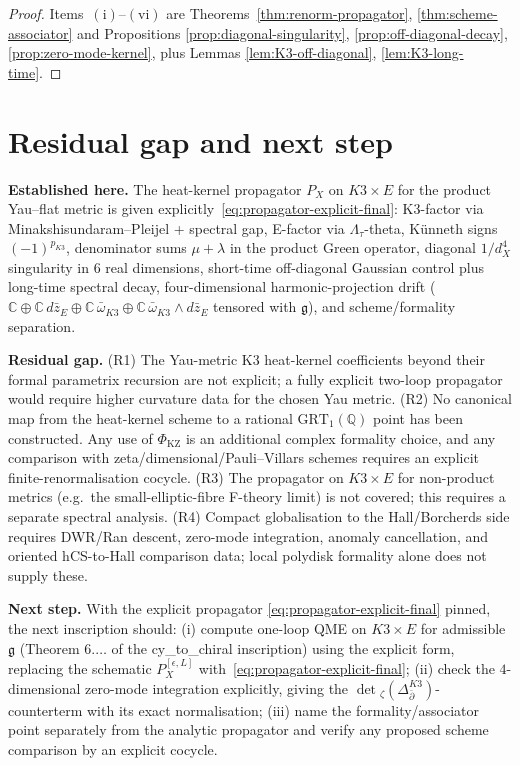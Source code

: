 \documentclass[11pt]{amsart}
\providecommand{\dbar}{\bar\partial}
\providecommand{\C}{\mathbb{C}}
\providecommand{\Q}{\mathbb{Q}}
\providecommand{\frakg}{\mathfrak{g}}
\providecommand{\GRT}{\mathrm{GRT}}
\theoremstyle{definition}
\theoremstyle{remark}
\begin{document}
\begin{proof}
Items~$(\mathrm{i})$--$(\mathrm{vi})$ are
Theorems~\ref{thm:renorm-propagator}, \ref{thm:scheme-associator}
and Propositions \ref{prop:diagonal-singularity},
\ref{prop:off-diagonal-decay}, \ref{prop:zero-mode-kernel}, plus
Lemmas \ref{lem:K3-off-diagonal}, \ref{lem:K3-long-time}.
\end{proof}

\section{Residual gap and next step}
\label{sec:residual}

\textbf{Established here.} The heat-kernel propagator
$P_X$ on $K3 \times E$ for the product Yau--flat metric is given
explicitly~\eqref{eq:propagator-explicit-final}: K3-factor via
Minakshisundaram--Pleijel + spectral gap, E-factor via
$\Lambda_\tau$-theta, K\"unneth signs $(-1)^{p_{K3}}$, denominator
sums $\mu+\lambda$ in the product Green operator, diagonal
$1/d_X^4$ singularity in $6$ real dimensions, short-time
off-diagonal Gaussian control plus long-time spectral decay,
four-dimensional harmonic-projection drift
($\C \oplus \C\,d\bar z_E \oplus \C\,\bar\omega_{K3}
\oplus \C\,\bar\omega_{K3} \wedge d\bar z_E$ tensored with $\frakg$),
and scheme/formality separation.

\textbf{Residual gap.}
(R1) The Yau-metric K3 heat-kernel coefficients beyond their formal
parametrix recursion are not explicit; a fully explicit two-loop
propagator would require higher curvature data for the chosen Yau
metric.
(R2) No canonical map from the heat-kernel scheme to a rational
$\GRT_1(\Q)$ point has been constructed. Any use of
$\Phi_{\mathrm{KZ}}$ is an additional complex formality choice, and
any comparison with zeta/dimensional/Pauli--Villars schemes requires
an explicit finite-renormalisation cocycle.
(R3) The propagator on $K3 \times E$ for non-product
metrics (e.g.\ the small-elliptic-fibre F-theory limit) is not
covered; this requires a separate spectral analysis.
(R4) Compact globalisation to the Hall/Borcherds side requires
DWR/Ran descent, zero-mode integration, anomaly cancellation, and
oriented hCS-to-Hall comparison data; local polydisk formality alone
does not supply these.

\textbf{Next step.} With the explicit propagator
\eqref{eq:propagator-explicit-final} pinned, the next inscription
should: (i) compute one-loop QME on $K3 \times E$ for admissible
$\frakg$ (Theorem $6.\ldots$ of the cy\_to\_chiral inscription)
using the explicit form, replacing the schematic
$P_X^{[\epsilon,L]}$ with~\eqref{eq:propagator-explicit-final};
(ii) check the $4$-dimensional zero-mode integration explicitly,
giving the $\det\!{}_\zeta(\Delta_{\dbar}^{K3})$-counterterm with
its exact normalisation; (iii) name the formality/associator point
separately from the analytic propagator and verify any proposed scheme
comparison by an explicit cocycle.
\end{document}
